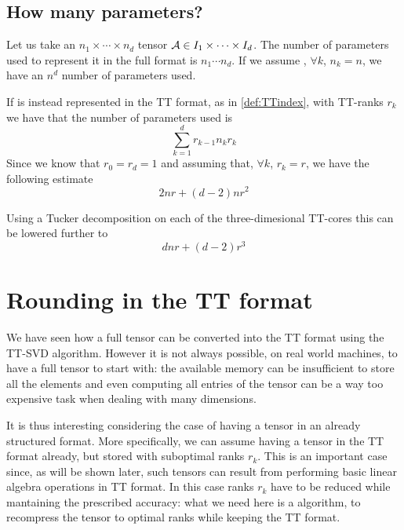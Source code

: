 
\subsection{How many parameters?}
Let us take an $n_1 \times \cdots \times n_d$ tensor $\mathcal{A} \in I_1 \times \cdots \times I_d$. The number of parameters used to represent it in the full format is $n_1 \cdots n_d$. If we assume , $\forall k$, $n_k  = n$, we have an $n^d$ number of parameters used.

If \A is instead represented in the TT format, as in \ref{def:TTindex}, with TT-ranks $r_k$ we have that the number of parameters used is
\begin{equation*}
  \sum_{k=1}^d r_{k-1} n_k r_k
\end{equation*}
Since we know that $r_0 = r_d = 1$ and assuming that, $\forall k$, $r_k = r$, we have the following estimate
\begin{equation*}
  2nr + (d-2)nr^2
\end{equation*}

Using a Tucker decomposition on each of the three-dimesional TT-cores this can be lowered further to
\begin{equation*}
  dnr + (d-2)r^3
\end{equation*}

\section{Rounding in the TT format}
We have seen how a full tensor can be converted into the TT format using the TT-SVD algorithm. However it is not always possible, on real world machines, to have a full tensor to start with: the available memory can be insufficient to store all the elements and even computing all entries of the tensor can be a way too expensive task when dealing with many dimensions.

It is thus interesting considering the case of having a tensor in an already structured format. More specifically, we can assume having a tensor in the TT format already, but stored with suboptimal ranks $r_k$. This is an important case since, as will be shown later, such tensors can result from performing basic linear algebra operations in TT format. In this case ranks $r_k$ have to be reduced while mantaining the prescribed accuracy: what we need here is a  algorithm, to recompress the tensor to optimal ranks while keeping the TT format.


